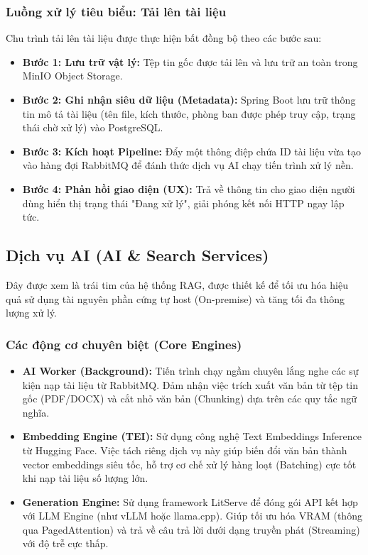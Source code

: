 \documentclass[12pt,a4paper]{report}
\begin{document}
\subsubsection{Luồng xử lý tiêu biểu: Tải lên tài liệu}
Chu trình tải lên tài liệu được thực hiện bất đồng bộ theo các bước sau:
\begin{itemize}
    \item \textbf{Bước 1: Lưu trữ vật lý:} Tệp tin gốc được tải lên và lưu trữ an toàn trong MinIO Object Storage.
    \item \textbf{Bước 2: Ghi nhận siêu dữ liệu (Metadata):} Spring Boot lưu trữ thông tin mô tả tài liệu (tên file, kích thước, phòng ban được phép truy cập, trạng thái chờ xử lý) vào PostgreSQL.
    \item \textbf{Bước 3: Kích hoạt Pipeline:} Đẩy một thông điệp chứa ID tài liệu vừa tạo vào hàng đợi RabbitMQ để đánh thức dịch vụ AI chạy tiến trình xử lý nền.
    \item \textbf{Bước 4: Phản hồi giao diện (UX):} Trả về thông tin cho giao diện người dùng hiển thị trạng thái "Đang xử lý", giải phóng kết nối HTTP ngay lập tức.
\end{itemize}

\subsection{Dịch vụ AI (AI \& Search Services)}
Đây được xem là trái tim của hệ thống RAG, được thiết kế để tối ưu hóa hiệu quả sử dụng tài nguyên phần cứng tự host (On-premise) và tăng tối đa thông lượng xử lý.

\subsubsection{Các động cơ chuyên biệt (Core Engines)}
\begin{itemize}
    \item \textbf{AI Worker (Background):} Tiến trình chạy ngầm chuyên lắng nghe các sự kiện nạp tài liệu từ RabbitMQ. Đảm nhận việc trích xuất văn bản từ tệp tin gốc (PDF/DOCX) và cắt nhỏ văn bản (Chunking) dựa trên các quy tắc ngữ nghĩa.
    \item \textbf{Embedding Engine (TEI):} Sử dụng công nghệ Text Embeddings Inference từ Hugging Face. Việc tách riêng dịch vụ này giúp biến đổi văn bản thành vector embeddings siêu tốc, hỗ trợ cơ chế xử lý hàng loạt (Batching) cực tốt khi nạp tài liệu số lượng lớn.
    \item \textbf{Generation Engine:} Sử dụng framework LitServe để đóng gói API kết hợp với LLM Engine (như vLLM hoặc llama.cpp). Giúp tối ưu hóa VRAM (thông qua PagedAttention) và trả về câu trả lời dưới dạng truyền phát (Streaming) với độ trễ cực thấp.
\end{itemize}
\end{document}
